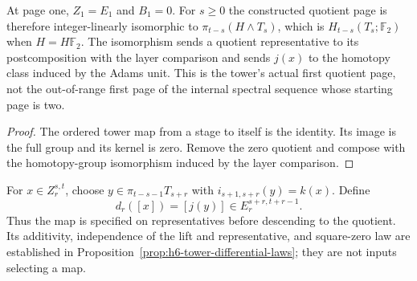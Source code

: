 \begin{proposition}
  \label{prop:h6-first-page-homology}
  \leanok
  At page one, $Z_1=E_1$ and $B_1=0$. For $s\ge0$ the constructed quotient
  page is therefore integer-linearly isomorphic to
  $\pi_{t-s}(H\wedge T_s)$, which is $H_{t-s}(T_s;\mathbb F_2)$ when
  $H=H\mathbb F_2$. The isomorphism sends a quotient representative to
  its postcomposition with the layer comparison and sends $j(x)$ to the
  homotopy class induced by the Adams unit. This is the tower's actual
  first quotient page, not the out-of-range first page of the internal
  spectral sequence whose starting page is two.
\end{proposition}
\begin{proof}
  The ordered tower map from a stage to itself is the identity. Its image
  is the full group and its kernel is zero. Remove the zero quotient and
  compose with the homotopy-group isomorphism induced by the layer comparison.
  \leanok
\end{proof}

\begin{definition}
  \label{def:h6-tower-differential}
  \notready
  For $x\in Z_r^{s,t}$, choose $y\in\pi_{t-s-1}T_{s+r}$ with
  $i_{s+1,s+r}(y)=k(x)$.  Define
  \[
    d_r([x])=[j(y)]\in E_r^{s+r,t+r-1}.
  \]
  Thus the map is specified on representatives before descending to the
  quotient.  Its additivity, independence of the lift and representative,
  and square-zero law are established in Proposition~\ref{prop:h6-tower-differential-laws}; they are not inputs selecting a map.
\end{definition}

